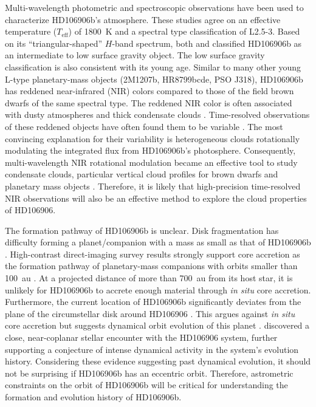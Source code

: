 \documentclass[twocolumn]{aastex62}
\newcommand{\teff}{\ensuremath{T_{\mathrm{eff}}}\xspace}
\begin{document}
Multi-wavelength photometric \citep{Bailey2013,Kalas2015,Wu2016} and spectroscopic \citep{Bailey2013, Daemgen2017} observations have been used to characterize HD106906b's atmosphere.  These studies agree on an effective temperature (\teff) of 1800~K and a spectral type classification of L2.5-3. Based on its ``triangular-shaped'' $H$-band spectrum, both \citet{Bailey2013} and \citet{Daemgen2017} classified HD106906b as an intermediate to low surface gravity object. The low surface gravity classification is also consistent with its young age. Similar to many other young L-type planetary-mass objects (2M1207b, HR8799bcde, PSO J318), HD106906b has reddened near-infrared (NIR) colors compared to those of the field brown dwarfs of the same spectral type. The reddened NIR color is often associated with dusty atmospheres and thick condensate clouds \citep[e.g.,][]{Skemer2011}. Time-resolved observations of these reddened objects have often found  them to be variable \citep[e.g.,][]{Biller2015,Zhou2016,Lew2016,Vos2017,Biller2017,Manjavacas2017,Zhou2019}. The most convincing explanation for their variability is heterogeneous clouds rotationally modulating the integrated flux from HD106906b's photosphere. Consequently, multi-wavelength NIR rotational modulation became an effective tool to study condensate clouds, particular vertical cloud profiles for brown dwarfs and planetary mass objects \citep[e.g.,][]{Apai2013, Biller2017, Zhou2018}. Therefore, it is likely that high-precision time-resolved NIR observations will also be an effective method to explore the cloud properties of HD106906.


The formation pathway of HD106906b is unclear. Disk fragmentation has difficulty forming a planet/companion with a mass as small as that of HD106906b \citep[e.g.,][]{Kratter2010}. High-contrast direct-imaging survey results strongly support core accretion as the formation pathway of planetary-mass companions with orbits smaller than 100~au \citep{Wagner2019,Nielsen2019}.  At a projected distance of more than 700~au from its host star, it is unlikely for HD106906b to accrete enough material through \emph{in situ} core accretion. Furthermore, the current location of HD106906b significantly deviates from the plane of the circumstellar disk around HD106906 \citep{Bailey2013,Kalas2015}. This argues against \emph{in situ} core accretion but suggests dynamical orbit evolution of this planet \citep[e.g.,][]{Marleau2019}.  \citet{DeRosa2019} discovered a close, near-coplanar stellar encounter with the HD106906 system, further supporting a conjecture of intense dynamical activity in the system's evolution history. Considering these evidence suggesting past dynamical evolution, it should not be surprising if HD106906b has an eccentric orbit. Therefore, astrometric constraints on the orbit of HD106906b will be critical for understanding the formation and evolution history of HD106906b.
\end{document}

